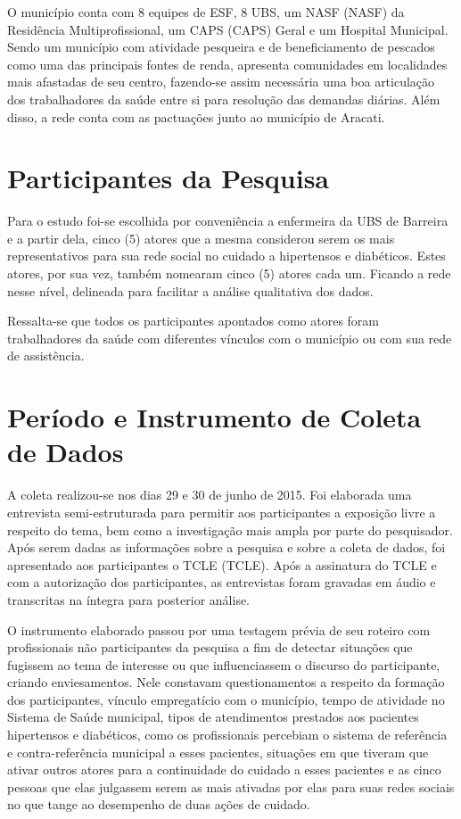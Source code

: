 O município conta com 8 equipes de \acrshort{ESF}, 8 \acrshort{UBS}, um \acrlong{NASF} (\acrshort{NASF}) da Residência Multiprofissional, um \acrlong{CAPS} (\acrshort{CAPS}) Geral e um Hospital Municipal. Sendo um município com atividade pesqueira e de beneficiamento de pescados como uma das principais fontes de renda, apresenta comunidades em localidades mais afastadas de seu centro, fazendo-se assim necessária uma boa articulação dos trabalhadores da saúde entre si para resolução das demandas diárias. Além disso, a rede conta com as pactuações junto ao município de Aracati.  

\section{Participantes da Pesquisa}
Para o estudo foi-se escolhida por conveniência a enfermeira da \acrlong{UBS} de Barreira e a partir dela, cinco (5) atores que a mesma considerou serem os mais representativos para sua rede social no cuidado a hipertensos e diabéticos. Estes atores, por sua vez, também nomearam cinco (5) atores cada um. Ficando a rede nesse nível, delineada para facilitar a análise qualitativa dos dados. 

Ressalta-se que todos os participantes apontados como atores foram trabalhadores da saúde com diferentes vínculos com o município ou com sua rede de assistência. 

\section{Período e Instrumento de Coleta de Dados}
A coleta realizou-se nos dias 29 e 30 de junho de 2015. Foi elaborada uma entrevista semi-estruturada para permitir aos participantes a exposição livre a respeito do tema, bem como a investigação mais ampla por parte do pesquisador. Após serem dadas as informações sobre a pesquisa e sobre a coleta de dados, foi apresentado aos participantes o \acrlong{TCLE} (\acrshort{TCLE}). Após a assinatura do \acrshort{TCLE}  e com a autorização dos participantes, as entrevistas foram gravadas em áudio e transcritas na íntegra para posterior análise. 

O instrumento elaborado passou por uma testagem prévia de seu roteiro com profissionais não participantes da pesquisa a fim de detectar situações que fugissem ao tema de interesse ou que influenciassem o discurso do participante, criando enviesamentos. Nele constavam questionamentos a respeito da formação dos participantes, vínculo empregatício com o município, tempo de atividade no Sistema de Saúde municipal, tipos de atendimentos prestados aos pacientes hipertensos e diabéticos, como os profissionais percebiam o sistema de referência e contra-referência municipal a esses pacientes, situações em que tiveram que ativar outros atores para a continuidade do cuidado a esses pacientes e as cinco pessoas que elas julgassem serem as mais ativadas por elas para suas redes sociais no que tange ao desempenho de duas ações de cuidado.  

